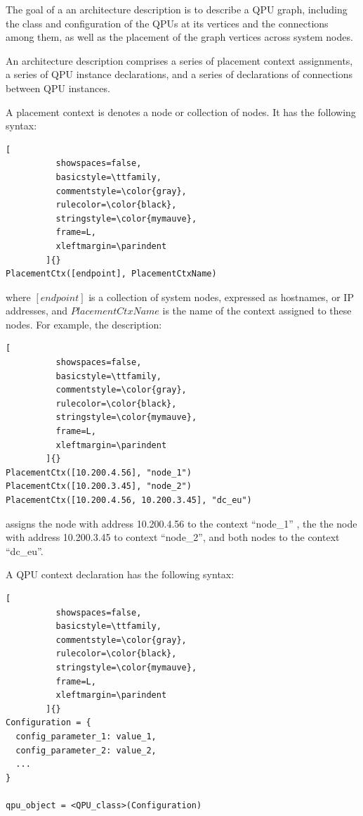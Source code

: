 The goal of a an architecture description is to describe a QPU graph,
including the class and configuration of the QPUs at its vertices and the connections among them,
as well as the placement of the graph vertices across system nodes.

An architecture description comprises a series of placement context assignments,
a series of QPU instance declarations, and a series of declarations of connections between QPU instances.

A placement context is denotes a node or collection of nodes.
It has the following syntax:

\begin{lstlisting}[
          showspaces=false,
          basicstyle=\ttfamily,
          commentstyle=\color{gray},
          rulecolor=\color{black},
          stringstyle=\color{mymauve},
          frame=L,
          xleftmargin=\parindent
        ]{}
PlacementCtx([endpoint], PlacementCtxName)
\end{lstlisting}

\noindent
where $[endpoint]$ is a collection of system nodes, expressed as hostnames, or IP addresses,
and $PlacementCtxName$ is the name of the context assigned to these nodes.
For example, the description:

\begin{lstlisting}[
          showspaces=false,
          basicstyle=\ttfamily,
          commentstyle=\color{gray},
          rulecolor=\color{black},
          stringstyle=\color{mymauve},
          frame=L,
          xleftmargin=\parindent
        ]{}
PlacementCtx([10.200.4.56], "node_1")
PlacementCtx([10.200.3.45], "node_2")
PlacementCtx([10.200.4.56, 10.200.3.45], "dc_eu")
\end{lstlisting}

\noindent
assigns the node with address 10.200.4.56 to the context ``node\_1'' ,
the the node with address 10.200.3.45  to context ``node\_2'',
and both nodes to the context ``dc\_eu''.

\medskip
\noindent
A QPU context declaration has the following syntax:

\begin{lstlisting}[
          showspaces=false,
          basicstyle=\ttfamily,
          commentstyle=\color{gray},
          rulecolor=\color{black},
          stringstyle=\color{mymauve},
          frame=L,
          xleftmargin=\parindent
        ]{}
Configuration = {
  config_parameter_1: value_1,
  config_parameter_2: value_2,
  ...
}

qpu_object = <QPU_class>(Configuration)
\end{lstlisting}

